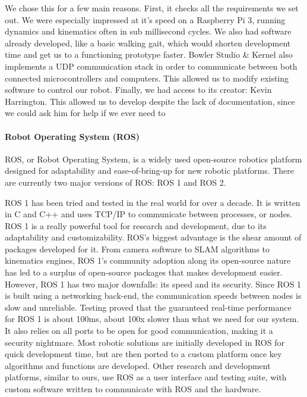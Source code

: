                 We chose this for a few main reasons. First, it checks all the requirements we set out. We were especially impressed at it's speed on a Raspberry Pi 3, running dynamics and kinematics often in sub millisecond cycles. We also had software already developed, like a basic walking gait, which would shorten development time and get us to a functioning prototype faster. Bowler Studio \& Kernel also implements a UDP communication stack in order to communicate between both connected microcontrollers and computers. This allowed us to modify existing software to control our robot. Finally, we had access to its creator: Kevin Harrington. This allowed us to develop despite the lack of documentation, since we could ask him for help if we ever need to
            
            \paragraph*{Robot Operating System (ROS)}
                ROS, or Robot Operating System, is a widely used open-source robotics platform designed for adaptability and ease-of-bring-up for new robotic platforms. There are currently two major versions of ROS: ROS 1 and ROS 2.
        
                ROS 1 has been tried and tested in the real world for over a decade. It is written in C and C++ and uses TCP/IP to communicate between processes, or nodes. ROS 1 is a really powerful tool for research and development, due to its adaptability and customizability. ROS's biggest advantage is the shear amount of packages developed for it. From camera software to SLAM algorithms to kinematics engines, ROS 1's community adoption along its open-source nature has led to a surplus of open-source packages that makes development easier. However, ROS 1 has two major downfalls: its speed and its security. Since ROS 1 is built using a networking back-end, the communication speeds between nodes is slow and unreliable. Testing proved that the guaranteed real-time performance for ROS 1 is about 100ms, about 100x slower than what we need for our system. It also relies on all ports to be open for good communication, making it a security nightmare. Most robotic solutions are initially developed in ROS for quick development time, but are then ported to a custom platform once key algorithms and functions are developed. Other research and development platforms, similar to ours, use ROS as a user interface and testing suite, with custom software written to communicate with ROS and the hardware.
        
